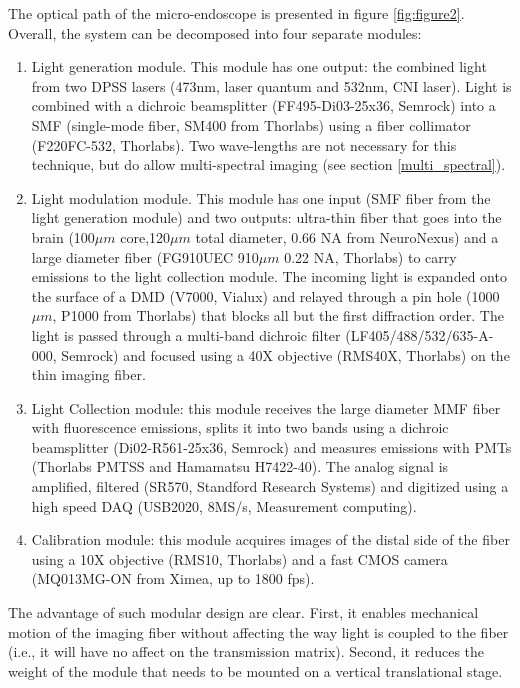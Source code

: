 \documentclass[10pt]{article}
\begin{document}
The optical path of the micro-endoscope is presented in figure \ref{fig:figure2}. Overall, the system can be decomposed into four separate modules: 
\begin{enumerate}
\item Light generation module. This module has one output: the combined light from two DPSS lasers (473nm, laser quantum and 532nm, CNI laser). Light is combined with a dichroic beamsplitter (FF495-Di03-25x36, Semrock) into a SMF (single-mode fiber, SM400 from Thorlabs) using a fiber collimator (F220FC-532, Thorlabs). Two wave-lengths are not necessary for this technique, but do allow multi-spectral imaging (see section \ref{multi_spectral}).
\item  Light modulation module. This module has one input (SMF fiber from the light generation module) and two outputs: ultra-thin fiber that goes into the brain (100$\mu m$ core,120$\mu m$ total diameter, 0.66 NA from NeuroNexus) and a large diameter fiber (FG910UEC 910$\mu m$ 0.22 NA, Thorlabs) to carry emissions to the light collection module. The incoming light is expanded onto the surface of a DMD (V7000, Vialux) and relayed through a pin hole (1000$\mu m$, P1000 from Thorlabs) that blocks all but the first diffraction order. The light is passed through a multi-band dichroic filter (LF405/488/532/635-A-000, Semrock) and focused using a 40X objective (RMS40X, Thorlabs) on the thin imaging fiber. 
\item Light Collection module: this module receives the large diameter MMF fiber with fluorescence emissions, splits it into two bands using a dichroic beamsplitter (Di02-R561-25x36, Semrock) and measures emissions with PMTs (Thorlabs PMTSS and Hamamatsu H7422-40). The analog signal is amplified, filtered (SR570, Standford Research Systems) and digitized using a high speed DAQ (USB2020, 8MS/s, Measurement computing).
\item Calibration module: this module acquires images of the distal side of the fiber using a 10X objective (RMS10, Thorlabs) and a fast CMOS camera (MQ013MG-ON from Ximea, up to 1800 fps).

\end{enumerate}

The advantage of such modular design are clear. First, it enables mechanical motion of the imaging fiber without affecting the way light is coupled to the fiber (i.e., it will have no affect on the transmission matrix). Second, it reduces the weight of the module that needs to be mounted on a vertical translational stage. 
\end{document}
